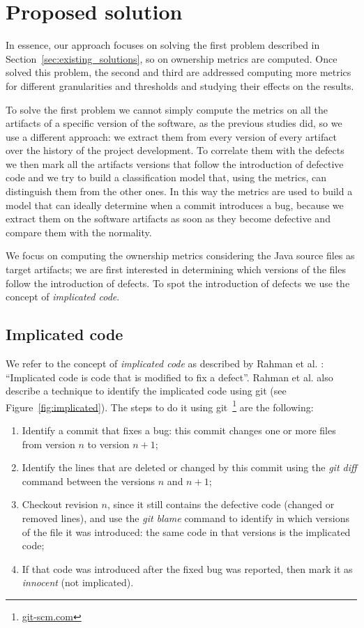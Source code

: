 \section{Proposed solution}

In essence, our approach focuses on solving the first problem described in Section~\ref{sec:existing_solutions}, so on  ownership metrics are computed. Once solved this problem, the second and third are addressed computing more metrics for different granularities and thresholds and studying their effects on the results.

To solve the first problem we cannot simply compute the metrics on all the artifacts of a specific version of the software, as the previous studies did, so we use a different approach: we extract them from every version of every artifact over the history of the project development. To correlate them with the defects we then mark all the artifacts versions that follow the introduction of defective code and we try to build a classification model that, using the metrics, can distinguish them from the other ones. In this way the metrics are used to build a model that can ideally determine when a commit introduces a bug, because we extract them on the software artifacts as soon as they become defective and compare them with the normality.

We focus on computing the ownership metrics considering the Java source files as target artifacts; we are first interested in determining which versions of the files follow the introduction of defects. To spot the introduction of defects we use the concept of \textit{implicated code}.

\subsection{Implicated code}
\label{sec:implicated}
We refer to the concept of \textit{implicated code} as described by Rahman et al. \cite{Rahman:blame}: ``Implicated code is code that is modified to fix a defect''. Rahman et al. also describe a technique to identify the implicated code using git (see Figure~\ref{fig:implicated}). The steps to do it using git~\footnote{\url{git-scm.com}} are the following:
\begin{enumerate}
\item Identify a commit that fixes a bug: this commit changes one or more files from version $n$ to version $n+1$;
\item Identify the lines that are deleted or changed by this commit using the \textit{git diff} command between the versions $n$ and $n+1$;
\item Checkout revision $n$, since it still contains the defective code (changed or removed lines), and use the \textit{git blame} command to identify in which versions of the file it was introduced: the same code in that versions is the implicated code;
\item If that code was introduced after the fixed bug was reported, then mark it as \textit{innocent} (not implicated).
\end{enumerate}

